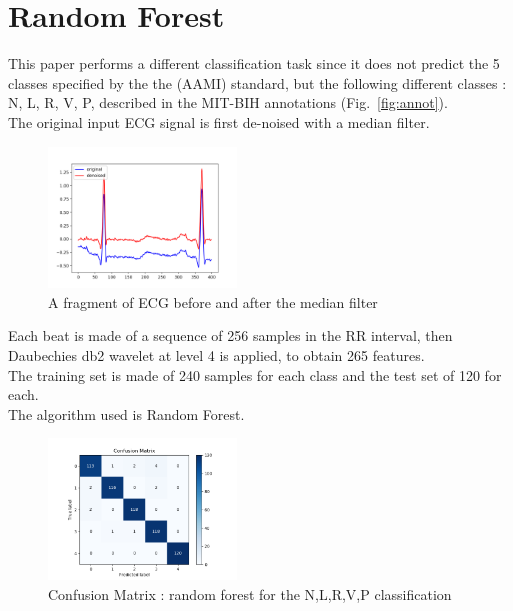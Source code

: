 \documentclass[LaM,binding=0.6cm]{sapthesis}
\begin{document}
\section{Random Forest}
This paper performs a different classification task since it does not predict the 5 classes specified by the 
the (AAMI) standard, but the following different classes : N, L, R, V, P, described in the MIT-BIH annotations (Fig.~\ref{fig:annot}).\\The original input ECG signal is first de-noised with a median filter.
\begin{figure}[H]
	\includegraphics[width=50mm,scale=0.7]{random-forest-before-after}
	\caption{A fragment of ECG before and after the median filter}
	\label{fig:rf1}
\end{figure}
Each beat is made of a sequence of 256 samples in the RR interval, then Daubechies db2 wavelet at level 4 is applied, to obtain 265 features.\\The training set is made of 240 samples for each class and the test set of 120 for each.\\The algorithm used is Random Forest.
\begin{figure}[H]
	\includegraphics[width=50mm,scale=0.7]{confusion-matrix-dwt-random-forest-paper.png}
	\caption{Confusion Matrix : random forest for the N,L,R,V,P classification}
	\label{fig: rf2  }
\end{figure}
\end{document}
